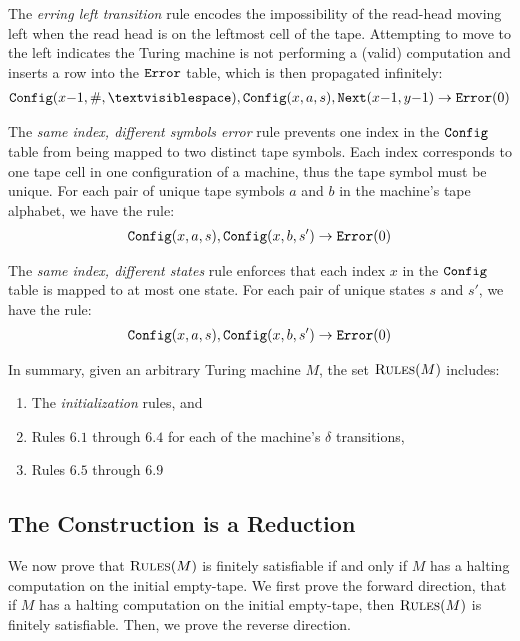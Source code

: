 The {\it erring left transition} rule
encodes the impossibility
of the read-head moving left when the read head
is on the leftmost cell of the tape.
Attempting to move to the left indicates the Turing machine
is not performing a (valid) computation and inserts a row into the $\texttt{\tt Error}$ table,
which is then propagated infinitely:
\begin{align}
\Config(x{-}1,\#,\blank), \Config(x,a,s), \Next(x{-}1,y{-}1) \rightarrow \Error(0)
\end{align}

The {\it same index, different symbols error} rule
prevents one index in the $\texttt{Config}$ table from
being mapped to two distinct tape symbols.
Each index corresponds to one tape cell
in one configuration of a machine,
thus the tape symbol must be unique.
For each pair of unique tape symbols $a$ and $b$ 
in the machine's tape alphabet,
we have the rule:
\begin{align}
\texttt{Config}(x,a,s), \texttt{Config}(x,b,s') \rightarrow \texttt{\tt Error}(0)
\end{align}

The {\it same index, different states} rule
enforces that each index $x$ in the $\texttt{Config}$ table
is mapped to at most one state.
For each pair of unique states $s$ and $s'$,
we have the rule:
\begin{align}
\texttt{Config}(x,a,s), \texttt{Config}(x,b,s') \rightarrow \texttt{\tt Error}(0)
\end{align}

In summary,
given an arbitrary Turing machine $M$,
the set $\textsc{Rules}(M)$ includes:
\begin{enumerate}
    \item The {\it initialization} rules, and
    \item Rules $6.1$ through $6.4$ for each of the machine's $\delta$ transitions,
    \item Rules $6.5$ through $6.9$
\end{enumerate}

\subsection{The Construction is a Reduction}
\label{subsection:reduction-sound-complete}

We now prove that
$\textsc{Rules}(M)$ is finitely satisfiable
if and only if
$M$ has a halting computation on the initial empty-tape.
We first prove the forward direction,
that if $M$ has a halting computation on the initial empty-tape,
then $\textsc{Rules}(M)$ is finitely satisfiable.
Then, we prove the reverse direction.

